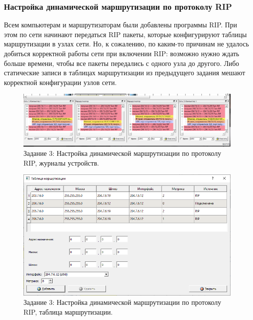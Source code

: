 \subsubsection{Настройка динамической маршрутизации по протоколу RIP}

Всем компьютерам и маршрутизаторам были добавлены программы RIP. При этом по сети начинают передаться RIP пакеты, которые конфигурируют таблицы маршрутизации в узлах сети. Но, к сожалению, по каким-то причинам не удалось добиться корректной работы сети при включении RIP: возможно нужно ждать больше времени, чтобы все пакеты передались с одного узла до другого. Либо статические записи в таблицах маршрутизации из предыдущего задания мешают корректной конфигурации узлов сети. 

\begin{figure}[H]
    \centering
    \includegraphics[width=1\linewidth]{res/task-3-rip.png}
    \caption{Задание 3: Настройка динамической маршрутизации по протоколу RIP, журналы устройств.}
    \label{fig:task-3-rip}
\end{figure}

\begin{figure}[H]
    \centering
    \includegraphics[width=1\linewidth]{res/task-3-rip-table.png}
    \caption{Задание 3: Настройка динамической маршрутизации по протоколу RIP, таблица маршрутизации.}
    \label{fig:task-3-rip-table}
\end{figure}

